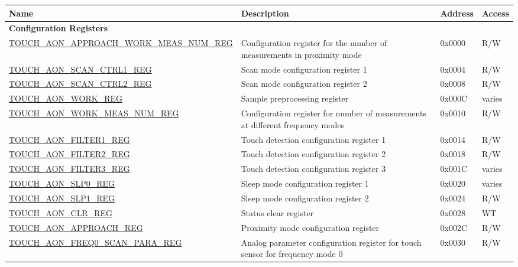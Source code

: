 \begin{longtable}{ | p{8cm} | p{12.5cm} | p{1.3cm} | p{1cm} | }
\hline\rowcolor{lightgray}
\textbf{Name} & \textbf{Description} &  \textbf{Address} & \textbf{Access} \\ \hline
\endhead
\multicolumn{4}{|l|}{\textbf{Configuration Registers}} \\ \hline
\hyperref[regdesc:TOUCHAONAPPROACHWORKMEASNUMREG]{TOUCH\_AON\_APPROACH\_WORK\_MEAS\_NUM\_REG} & Configuration register for the number of measurements in proximity mode & 0x0000 & R/W \\ \hline
\hyperref[regdesc:TOUCHAONSCANCTRL1REG]{TOUCH\_AON\_SCAN\_CTRL1\_REG} & Scan mode configuration register 1 & 0x0004 & R/W \\ \hline
\hyperref[regdesc:TOUCHAONSCANCTRL2REG]{TOUCH\_AON\_SCAN\_CTRL2\_REG} & Scan mode configuration register 2 & 0x0008 & R/W \\ \hline
\hyperref[regdesc:TOUCHAONWORKREG]{TOUCH\_AON\_WORK\_REG} & Sample preprocessing register & 0x000C & varies \\ \hline
\hyperref[regdesc:TOUCHAONWORKMEASNUMREG]{TOUCH\_AON\_WORK\_MEAS\_NUM\_REG} & Configuration register for number of measurements at different frequency modes & 0x0010 & R/W \\ \hline
\hyperref[regdesc:TOUCHAONFILTER1REG]{TOUCH\_AON\_FILTER1\_REG} & Touch detection configuration register 1 & 0x0014 & R/W \\ \hline
\hyperref[regdesc:TOUCHAONFILTER2REG]{TOUCH\_AON\_FILTER2\_REG} & Touch detection configuration register 2 & 0x0018 & R/W \\ \hline
\hyperref[regdesc:TOUCHAONFILTER3REG]{TOUCH\_AON\_FILTER3\_REG} & Touch detection configuration register 3 & 0x001C & varies \\ \hline
\hyperref[regdesc:TOUCHAONSLP0REG]{TOUCH\_AON\_SLP0\_REG} & Sleep mode configuration register 1 & 0x0020 & varies \\ \hline
\hyperref[regdesc:TOUCHAONSLP1REG]{TOUCH\_AON\_SLP1\_REG} & Sleep mode configuration register 2 & 0x0024 & R/W \\ \hline
\hyperref[regdesc:TOUCHAONCLRREG]{TOUCH\_AON\_CLR\_REG} & Status clear register & 0x0028 & WT \\ \hline
\hyperref[regdesc:TOUCHAONAPPROACHREG]{TOUCH\_AON\_APPROACH\_REG} & Proximity mode configuration register & 0x002C & R/W \\ \hline
\hyperref[regdesc:TOUCHAONFREQ0SCANPARAREG]{TOUCH\_AON\_FREQ0\_SCAN\_PARA\_REG} & Analog parameter configuration register for touch sensor for frequency mode 0 & 0x0030 & R/W \\ \hline

\end{longtable}
